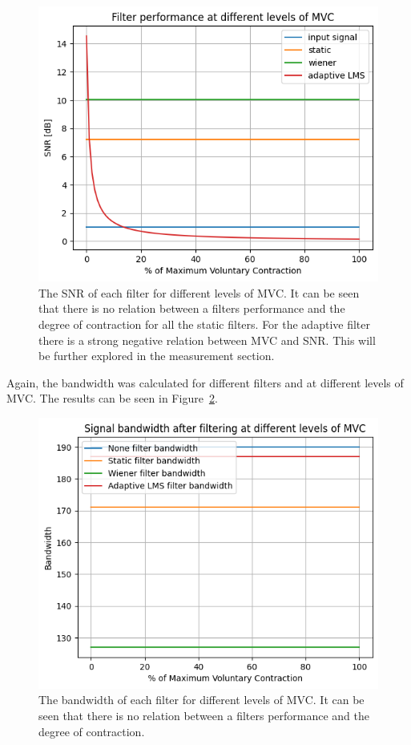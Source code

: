 \begin{figure}[h!t]
	\begin{center}
		\includegraphics[width=0.7\columnwidth]{images/filter_snr_mvc.png}
	\end{center}
	\caption{The SNR of each filter for different levels of MVC. It can be seen that there is no relation between a filters performance and the degree of contraction for all the static filters. For the adaptive filter there is a strong negative relation between MVC and SNR. This will be further explored in the measurement section.}
	\label{fig:filter_snr_mvc}
\end{figure}

Again, the bandwidth was calculated for different filters and at different levels of MVC. The results can be seen in Figure~\ref{fig:filter_bw_mvc}.

\begin{figure}[h!t]
	\begin{center}
		\includegraphics[width=0.7\columnwidth]{images/filter_bw_mvc.png}
	\end{center}
	\caption{The bandwidth of each filter for different levels of MVC. It can be seen that there is no relation between a filters performance and the degree of contraction. }
	\label{fig:filter_bw_mvc}
\end{figure}

